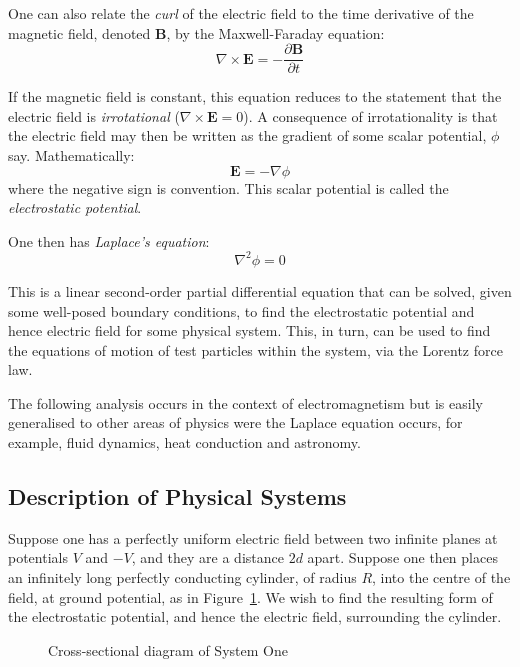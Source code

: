\documentclass[12pt, a4paper]{article}
\newcommand{\be}{\begin{equation}}
\newcommand{\ee}{\end{equation}}
\begin{document}
One can also relate the \emph{curl} of the electric field to the time
derivative of the magnetic field, denoted \textbf{B}, by the Maxwell-Faraday equation:
%
\be
\nabla \times \bm{E} = - \frac{\partial \bm{B}}{\partial t}
\ee

If the magnetic field is constant, this equation reduces to the statement that
the electric field is \emph{irrotational} ($\nabla \times \bm{E}=0$). A
consequence of irrotationality is that the electric field may then be written as
the gradient of some scalar potential, $\phi$ say. Mathematically:
%
\be
\bm{E} = -\nabla \phi
\ee
%
where the negative sign is convention. This scalar potential is called the
\emph{electrostatic potential}.

One then has \emph{Laplace's equation}:
%
\be
\nabla^2 \phi = 0
\ee

This is a linear second-order partial differential equation that can be solved, given
some well-posed boundary conditions, to find the electrostatic potential and hence
electric field for some physical system. This, in turn, can be used to find the
equations of motion of test particles within the system, via the Lorentz force law.

The following analysis occurs in the context of electromagnetism but is easily
generalised to other areas of physics were the Laplace equation occurs, for example,
fluid dynamics, heat conduction and astronomy.

\subsection{Description of Physical Systems}

Suppose one has a perfectly uniform electric field between two infinite planes
at potentials $V$ and $-V$, and they are a distance $2d$ apart. Suppose one then
places an infinitely long perfectly conducting cylinder, of radius $R$, into the centre
of the field, at ground potential, as in Figure~\ref{fig:sys one}. We wish to find the
resulting form of the electrostatic potential, and hence the electric field, surrounding
the cylinder.

\begin{figure}[h!]
\begin{center}
\end{center}
\caption{Cross-sectional diagram of System One}
\label{fig:sys one}
\end{figure}
\end{document}
